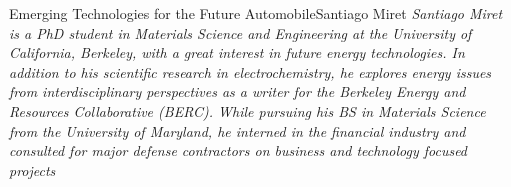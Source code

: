 \documentclass{papertex}
\begin{document}
\begin{news}{2}{Emerging Technologies for the Future Automobile}{Santiago Miret}{}{}
\emph{Santiago Miret is a PhD student in Materials Science and Engineering at the University of California, Berkeley, with a great interest in future energy technologies. In addition to his scientific research in electrochemistry, he explores energy issues from interdisciplinary perspectives as a writer for the Berkeley Energy and Resources Collaborative (BERC). While pursuing his BS in Materials Science from the University of Maryland, he interned in the financial industry and consulted for major defense contractors on business and technology focused projects}

\end{news}
\end{document}
